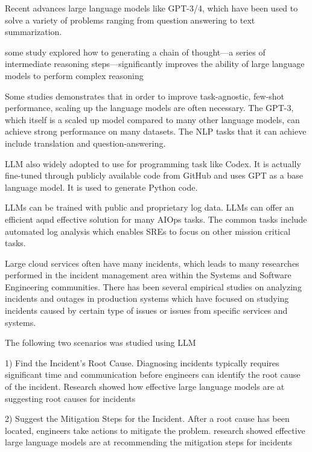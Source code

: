 \documentclass[conference]{IEEEtran}
\begin{document}
Recent advances large language models like GPT-3/4, which have been used to solve a variety of problems ranging from question answering to text summarization. 

some study explored how to generating a chain of thought---a series of intermediate reasoning steps---significantly improves the ability of large language models to perform complex reasoning\cite{wei2022chain}

Some studies demonstrates that in order to improve task-agnostic, few-shot performance, scaling up the language models are often necessary. The GPT-3, which itself is a scaled up model compared to many other language models, can achieve strong performance on many datasets. The NLP tasks that it can achieve include translation and question-answering. \cite{brown2020language}

LLM also widely adopted to use for programming task like Codex. It is actually fine-tuned through publicly available code from GitHub and uses GPT as a base language model.
It is used to generate Python code. \cite{chen2021evaluating}

LLMs can be trained with public and proprietary log data. LLMs can offer an efficient aqnd effective solution for many AIOps tasks. The common tasks include automated log analysis which enables SREs to focus on other mission critical tasks.\cite{gupta2023learning}

Large cloud services often have many incidents, which leads to many researches performed in the incident management area within the Systems and Software Engineering communities. There has been several empirical studies on analyzing incidents and outages in production systems which have focused on studying incidents caused by certain type of issues or issues from specific services and systems.\cite{10172904} 

The following two scenarios was studied using LLM \cite{10172904} 

1) Find the Incident's Root Cause. Diagnosing incidents typically requires significant time and communication before engineers can identify the root cause of the incident. Research showed how effective large language models are at suggesting root causes for incidents\cite{10172904} 

2) Suggest the Mitigation Steps for the Incident. After a root cause has been located, engineers take actions to mitigate the problem. research showed effective large language models are at recommending the mitigation steps for incidents\cite{10172904} 
\end{document}
